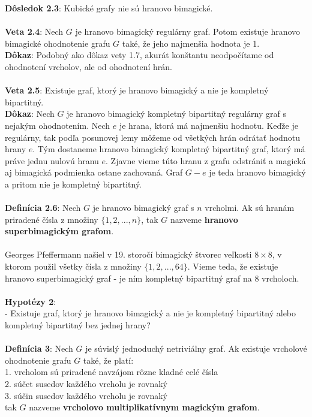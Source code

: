 \documentclass[12pt]{article}
\begin{document}
\textbf{Dôsledok 2.3}: Kubické grafy nie sú hranovo bimagické. \\\\

\textbf{Veta 2.4}: Nech $G$ je hranovo bimagický regulárny graf. Potom existuje hranovo bimagické ohodnotenie grafu $G$ také, že jeho najmenšia hodnota je 1. \\

\textbf{Dôkaz}: Podobný ako dôkaz vety 1.7, akurát konštantu neodpočítame od ohodnotení vrcholov, ale od ohodnotení hrán. \\\\

\textbf{Veta 2.5}: Existuje graf, ktorý je hranovo bimagický a nie je kompletný bipartitný. \\

\textbf{Dôkaz}: Nech $G$ je hranovo bimagický kompletný bipartitný regulárny graf s nejakým ohodnotením. Nech $e$ je hrana, ktorá má najmenšiu hodnotu. Keďže je regulárny, tak podľa posunovej lemy môžeme od všetkých hrán odrátať hodnotu hrany $e$. Tým dostaneme hranovo bimagický kompletný bipartitný graf, ktorý má práve jednu nulovú hranu $e$. Zjavne vieme túto hranu z grafu odstrániť a magická aj bimagická podmienka ostane zachovaná. Graf $G - e$ je teda hranovo bimagický a pritom nie je kompletný bipartitný. \\\\

\textbf{Definícia 2.6}: Nech $G$ je hranovo bimagický graf s $n$ vrcholmi. Ak sú hranám priradené čísla z množiny $\{1, 2, ... , n\}$, tak $G$ nazveme \textbf{hranovo superbimagickým grafom}. \\\\

Georges Pfeffermann našiel v 19. storočí bimagický štvorec veľkosti $8 \times 8$, v ktorom použil všetky čísla z množiny $\{1, 2, ... , 64\}$. Vieme teda, že existuje hranovo superbimagický graf - je ním kompletný bipartitný graf na $8$ vrcholoch. \\\\

\textbf{Hypotézy 2}: \\
- Existuje graf, ktorý je hranovo bimagický a nie je kompletný bipartitný alebo kompletný bipartitný bez jednej hrany? \\\\

\textbf{Definícia 3}: Nech $G$ je súvislý jednoduchý netriviálny graf. Ak existuje vrcholové ohodnotenie grafu $G$ také, že platí: \\
1. vrcholom sú priradené navzájom rôzne kladné celé čísla \\
2. súčet susedov každého vrcholu je rovnaký \\
3. súčin susedov každého vrcholu je rovnaký \\
tak $G$ nazveme \textbf{vrcholovo multiplikatívnym magickým grafom}. \\
\end{document}
